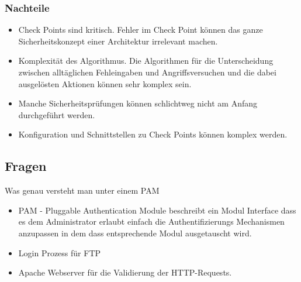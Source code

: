 \subsubsection*{Nachteile}

\begin{itemize}
	\item Check Points sind kritisch. Fehler im Check Point können das ganze Sicherheitskonzept einer Architektur irrelevant machen.
	\item Komplexität des Algorithmus. Die Algorithmen für die Unterscheidung zwischen alltäglichen Fehleingaben und Angriffsversuchen und die dabei ausgelösten Aktionen können sehr komplex sein.
	\item Manche Sicherheitsprüfungen können schlichtweg nicht am Anfang durchgeführt werden.
	\item Konfiguration und Schnittstellen zu Check Points können komplex werden.
\end{itemize}

\subsection*{Fragen}

Was genau versteht man unter einem PAM
\begin{itemize}
	\item PAM - Pluggable Authentication Module beschreibt ein Modul Interface dass es dem Administrator erlaubt einfach die Authentifizierungs Mechanismen anzupassen in dem dass entsprechende Modul ausgetauscht wird.
\end{itemize}

\begin{itemize}
	\item Login Prozess für FTP
	\item Apache Webserver für die Validierung der HTTP-Requests.
\end{itemize}

